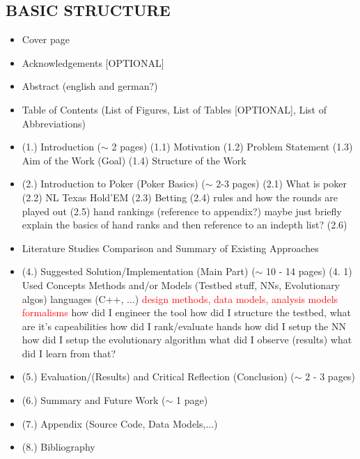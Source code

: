 \subsection{BASIC STRUCTURE}
\begin{itemize}
\item Cover page
\item Acknowledgements [OPTIONAL]
\item Abstract (english and german?)
\item Table of Contents (List of Figures, List of Tables [OPTIONAL], List of Abbreviations)
\item (1.) Introduction ($\sim$ 2 pages)
\subitem (1.1) Motivation
\subitem (1.2) Problem Statement
\subitem (1.3) Aim of the Work (Goal)
\subitem (1.4) Structure of the Work
\item (2.) Introduction to Poker (Poker Basics) ($\sim$ 2-3 pages)
\subitem (2.1) What is poker
\subitem (2.2) NL Texas Hold'EM
\subitem (2.3) Betting
\subitem (2.4) rules and how the rounds are played out
\subitem (2.5) hand rankings (reference to appendix?) 
\subsubitem maybe just briefly explain the basics of hand ranks and then reference to an indepth list?
\subitem (2.6) 
\item {} 
\subitem Literature Studies
\subitem Comparison and Summary of Existing Approaches
\item (4.) Suggested Solution/Implementation (Main Part) ($\sim$ 10 - 14 pages)
\subitem (4. 1)
\subsubitem Used Concepts 
\subsubitem Methods and/or Models (Testbed stuff, NNs, Evolutionary algos)
\subsubitem languages (C++, ...)
\subsubitem \textcolor{red}{design methods, data models, analysis models}
\subsubitem \textcolor{red}{formalisms}
\subitem how did I engineer the tool
\subitem how did I structure the testbed, what are it's capeabilities
\subitem how did I rank/evaluate hands
\subitem how did I setup the NN
\subitem how did I setup the evolutionary algorithm
\subitem what did I observe (results)
\subitem what did I learn from that?
\item (5.) Evaluation/(Results) and Critical Reflection (Conclusion) ($\sim$ 2 - 3 pages)
\item (6.) Summary and Future Work ($\sim$ 1 page)
\item (7.) Appendix (Source Code, Data Models,...)
\item (8.) Bibliography
\end{itemize}
\pagebreak
